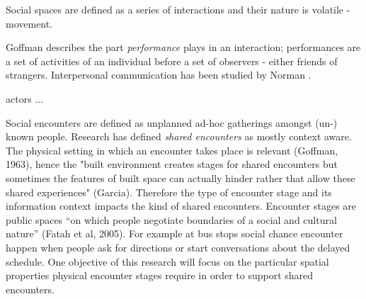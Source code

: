Social spaces are defined as a series of interactions and their nature is volatile - movement.

Goffman \cite{Goffman_1966} describes the part \textit{performance}  plays in an interaction; performances are a set of activities of an individual before a set of observers - either friends of strangers.
Interpersonal communication has been studied by Norman \cite{Norman_1988}.

actors ... 

Social encounters are defined as unplanned ad-hoc gatherings amongst (un-) known people. Research has defined \textit{shared encounters}  as mostly context aware. The physical setting in which an encounter takes place is relevant (Goffman, 1963), hence the "built environment creates stages for shared encounters but sometimes the features of built space can actually hinder rather that allow these shared experiences" (Garcia). Therefore the type of encounter stage and its information context impacts the kind of shared encounters. Encounter stages are public spaces “on which people negotiate boundaries of a social and cultural nature” (Fatah et al, 2005). For example at bus stops social chance encounter happen when people ask for directions or start conversations about the delayed schedule. One objective of this research will focus on the particular spatial properties physical encounter stages require in order to support shared encounters.


